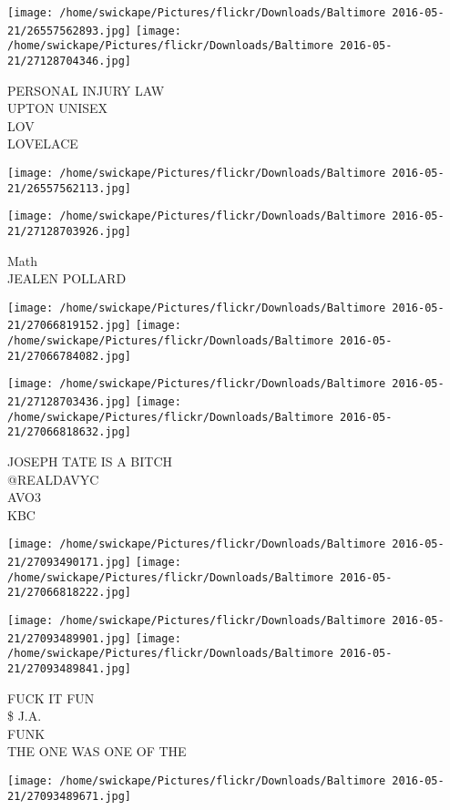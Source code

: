 \documentclass[10pt,letterpaper]{article}
\begin{document}
\texttt{[image: /home/swickape/Pictures/flickr/Downloads/Baltimore 2016-05-21/26557562893.jpg]}
\texttt{[image: /home/swickape/Pictures/flickr/Downloads/Baltimore 2016-05-21/27128704346.jpg]}

PERSONAL INJURY LAW\\
UPTON UNISEX\\
LOV\\
LOVELACE
\pagebreak

\texttt{[image: /home/swickape/Pictures/flickr/Downloads/Baltimore 2016-05-21/26557562113.jpg]}

\vspace{0.25in}
\texttt{[image: /home/swickape/Pictures/flickr/Downloads/Baltimore 2016-05-21/27128703926.jpg]}

Math\\
JEALEN POLLARD
\pagebreak

\texttt{[image: /home/swickape/Pictures/flickr/Downloads/Baltimore 2016-05-21/27066819152.jpg]}
\texttt{[image: /home/swickape/Pictures/flickr/Downloads/Baltimore 2016-05-21/27066784082.jpg]}

\texttt{[image: /home/swickape/Pictures/flickr/Downloads/Baltimore 2016-05-21/27128703436.jpg]}
\texttt{[image: /home/swickape/Pictures/flickr/Downloads/Baltimore 2016-05-21/27066818632.jpg]}

JOSEPH TATE IS A BITCH\\
@REALDAVYC\\
AVO3\\
KBC
\pagebreak

\texttt{[image: /home/swickape/Pictures/flickr/Downloads/Baltimore 2016-05-21/27093490171.jpg]}
\texttt{[image: /home/swickape/Pictures/flickr/Downloads/Baltimore 2016-05-21/27066818222.jpg]}

\texttt{[image: /home/swickape/Pictures/flickr/Downloads/Baltimore 2016-05-21/27093489901.jpg]}
\texttt{[image: /home/swickape/Pictures/flickr/Downloads/Baltimore 2016-05-21/27093489841.jpg]}

FUCK IT FUN\\
\$ J.A.\\
FUNK\\
THE ONE WAS ONE OF THE
\pagebreak

\texttt{[image: /home/swickape/Pictures/flickr/Downloads/Baltimore 2016-05-21/27093489671.jpg]}
\end{document}
